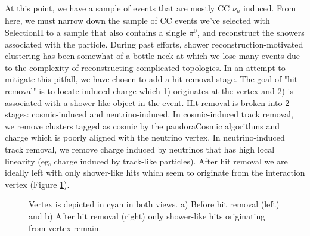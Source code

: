 \documentclass[12pt]{article}
\begin{document}
At this point, we have a sample of events that are mostly CC $\nu_\mu$ induced. From here, we must narrow down the sample of CC events we've selected with SelectionII to a sample that also contains a single $\pi^0$, and reconstruct the showers associated with the particle. During past efforts, shower reconstruction-motivated clustering has been somewhat of a bottle neck at which we lose many events due to the complexity of reconstructing complicated topologies. In an attempt to mitigate this pitfall, we have chosen to add a hit removal stage. The goal of "hit removal" is to locate induced charge which 1) originates at the vertex and 2) is associated with a shower-like object in the event. Hit removal is broken into 2 stages: cosmic-induced and neutrino-induced.  In cosmic-induced track removal, we remove clusters tagged as cosmic by the pandoraCosmic algorithms and charge which is poorly aligned with the neutrino vertex.  In neutrino-induced track removal, we remove charge induced by neutrinos that has high local linearity (eg, charge induced by track-like particles). After hit removal we are ideally left with only shower-like hits which seem to originate from the interaction vertex (Figure \ref{fig:hitremoval}). %

\begin{figure}[h!]
\centering
{}
\hspace{1 mm}
\caption{Vertex is depicted in cyan in both views. a) Before hit removal (left) and b) After hit removal (right) only shower-like hits originating from vertex remain. }
\label{fig:hitremoval}
\end{figure}
\end{document}
